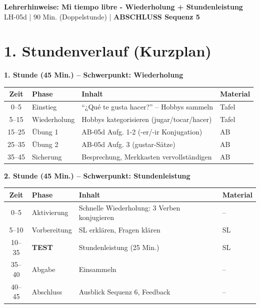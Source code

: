 \documentclass[11pt, a4paper]{article}
\newcommand{\fachfarbe}{spanisch}
\newcommand{\thema}{Mi tiempo libre - Wiederholung + Stundenleistung}
\newcommand{\sequenz}{05}
\newcommand{\block}{d}
\newcommand{\dauer}{90 Min. (Doppelstunde)}
\begin{document}
\begin{center}
    {\Large\bfseries\textcolor{\fachfarbe}{Lehrerhinweise: \thema}}\\[0.3em]
    {\normalsize LH-\sequenz\block{} | \dauer{} | \textbf{ABSCHLUSS Sequenz 5}}
\end{center}

\vspace{10pt}

\section*{1. Stundenverlauf (Kurzplan)}

\textbf{1. Stunde (45 Min.) -- Schwerpunkt: Wiederholung}

\begin{tabularx}{\textwidth}{|c|l|X|l|}
\hline
\textbf{Zeit} & \textbf{Phase} & \textbf{Inhalt} & \textbf{Material} \\
\hline
0--5 & Einstieg & ``¿Qué te gusta hacer?'' -- Hobbys sammeln & Tafel \\
\hline
5--15 & Wiederholung & Hobbys kategorisieren (jugar/tocar/hacer) & Tafel \\
\hline
15--25 & Übung 1 & AB-05d Aufg. 1-2 (-er/-ir Konjugation) & AB \\
\hline
25--35 & Übung 2 & AB-05d Aufg. 3 (gustar-Sätze) & AB \\
\hline
35--45 & Sicherung & Besprechung, Merkkasten vervollständigen & AB \\
\hline
\end{tabularx}

\vspace{1em}

\textbf{2. Stunde (45 Min.) -- Schwerpunkt: Stundenleistung}

\begin{tabularx}{\textwidth}{|c|l|X|l|}
\hline
\textbf{Zeit} & \textbf{Phase} & \textbf{Inhalt} & \textbf{Material} \\
\hline
0--5 & Aktivierung & Schnelle Wiederholung: 3 Verben konjugieren & -- \\
\hline
5--10 & Vorbereitung & SL erklären, Fragen klären & SL \\
\hline
10--35 & \textbf{TEST} & Stundenleistung (25 Min.) & SL \\
\hline
35--40 & Abgabe & Einsammeln & -- \\
\hline
40--45 & Abschluss & Ausblick Sequenz 6, Feedback & -- \\
\hline
\end{tabularx}
\end{document}
